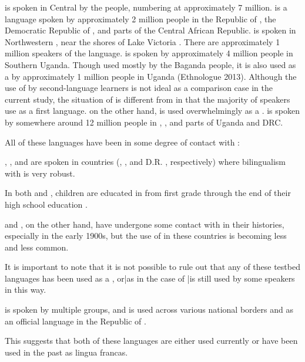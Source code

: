 \documentclass[output=paper,
modfonts
]{langscibook}
\begin{document}
   is spoken in Central  by the  people, numbering at approximately 7 million.   is a language spoken by approximately 2 million people in the Republic of , the Democratic Republic of , and parts of the Central African Republic.  is spoken in Northwestern , near the shores of Lake Victoria \citep{Byarushengo1977}. There are approximately 1 million speakers of the language.  is spoken by approximately 4 million people in Southern Uganda. Though used mostly by the Baganda people, it is also used as a  by approximately 1 million people in Uganda (Ethnologue 2013).
		   Although the use of  by second-language learners is not ideal as a comparison case in the current study, the situation of  is different from  in that the majority of speakers use  as a first language.  on the other hand, is used overwhelmingly as a .
		  is spoken by somewhere around 12 million people in , , and parts of Uganda and DRC.
	 
\iffalse%
  All of these languages have been in some degree of contact with :
	 
	  , , and  are spoken in countries (, , and D.R. , respectively) where bilingualism with  is very robust. 
	
	  In both  and , children are educated in  from first grade through the end of their high school education \citep{brock:2001}. 
	
	   and , on the other hand, have undergone some contact with  in their histories, especially in the early 1900s, but the use of  in these countries is becoming less and less common. 
	 
 
  It is important to note that it is not possible to rule out that any of these testbed languages has been used as a , or|as in the case of |is still used by some speakers in this way. 

	 
	   is spoken by multiple groups, and  is used across various national borders and as an official language in the Republic of . 
	
	  This suggests that both of these languages are either used currently or have been used in the past as lingua francas. 
\end{document}
